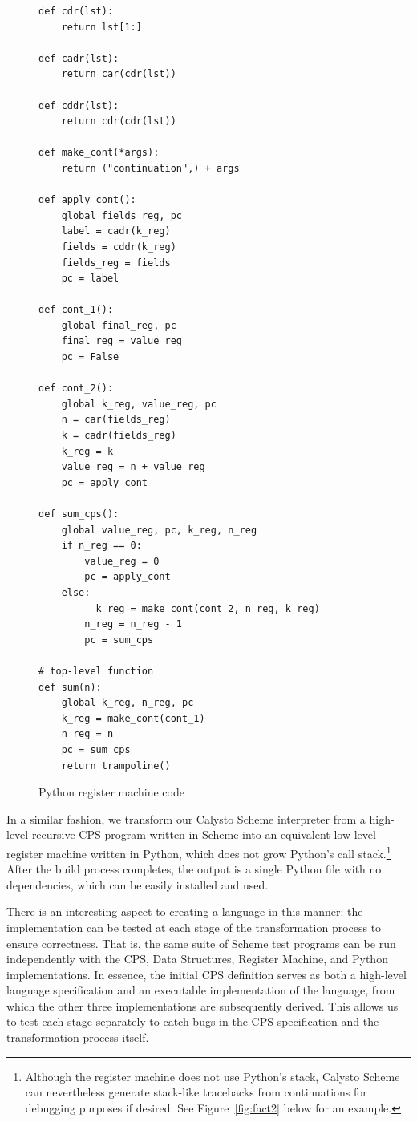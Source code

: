 \documentclass[acmsmall,screen,authorversion]{acmart}
\begin{document}
\begin{figure}[h!]
\begin{minipage}{0.4\textwidth}
{\begin{verbatim}
def cdr(lst):
    return lst[1:]

def cadr(lst):
    return car(cdr(lst))

def cddr(lst):
    return cdr(cdr(lst))

def make_cont(*args):
    return ("continuation",) + args

def apply_cont():
    global fields_reg, pc
    label = cadr(k_reg)
    fields = cddr(k_reg)
    fields_reg = fields
    pc = label

def cont_1():
    global final_reg, pc
    final_reg = value_reg
    pc = False

def cont_2():
    global k_reg, value_reg, pc
    n = car(fields_reg)
    k = cadr(fields_reg)
    k_reg = k
    value_reg = n + value_reg
    pc = apply_cont

def sum_cps():
    global value_reg, pc, k_reg, n_reg
    if n_reg == 0:
        value_reg = 0
        pc = apply_cont
    else:
          k_reg = make_cont(cont_2, n_reg, k_reg)
        n_reg = n_reg - 1
        pc = sum_cps

# top-level function
def sum(n):
    global k_reg, n_reg, pc
    k_reg = make_cont(cont_1)
    n_reg = n
    pc = sum_cps
    return trampoline()
\end{verbatim}
}
\caption{Python register machine code}
\label{fig:pythonRM}
\end{minipage}
\end{figure}


In a similar fashion, we transform our Calysto Scheme interpreter from a
high-level recursive CPS program written in Scheme into an equivalent low-level
register machine written in Python, which does not grow Python's call
stack.\footnote[2]{Although the register machine does not use Python's stack,
  Calysto Scheme can nevertheless generate stack-like tracebacks from
  continuations for debugging purposes if desired. See Figure~\ref{fig:fact2}
  below for an example.}  After the build process completes, the output is a
single Python file with no dependencies, which can be easily installed and
used.

There is an interesting aspect to creating a language in this manner: the
implementation can be tested at each stage of the transformation process to
ensure correctness. That is, the same suite of Scheme test programs can be run
independently with the CPS, Data Structures, Register Machine, and Python
implementations. In essence, the initial CPS definition serves as both a
high-level language specification and an executable implementation of the
language, from which the other three implementations are subsequently
derived. This allows us to test each stage separately to catch bugs in the CPS
specification and the transformation process itself.
\end{document}
